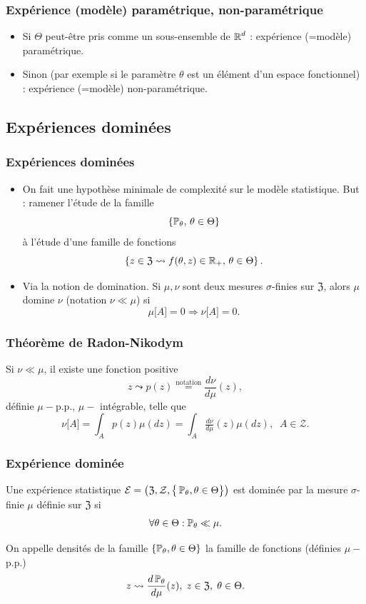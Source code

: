 \begin{frame}
\frametitle{Expérience (mod\`ele) paramétrique, non-paramétrique}
\begin{itemize}
\item Si $\Theta$ peut-être \og pris \fg{} comme un sous-ensemble
de $\operatorname{{\mathbb R}}^d$ : \alert{expérience (=mod\`ele) paramétrique}.
\item Sinon (par exemple si le paramètre $\theta$ est un élément d'un espace fonctionnel) : \alert{expérience (=mod\`ele) non-paramétrique}.
\end{itemize}
\end{frame}

\subsection{Expériences dominées}
\begin{frame}
\frametitle{Expériences dominées}
\begin{itemize}
\item On fait une hypothèse minimale de \og complexité \fg{} sur le modèle statistique. \alert{But} : ramener l'étude de la famille
$$\{\operatorname{{\mathbb P}}_\theta,\,\theta \in \Theta\}$$
à l'étude d'une famille de fonctions
$$\left\{z \in \mathfrak{Z} \leadsto f(\theta,z) \in \operatorname{{\mathbb R}}_+,\,\theta \in \Theta\right\}.$$
\item Via la notion de \alert{domination}. Si $\mu,\nu$ sont deux mesures $\sigma$-finies sur $\mathfrak{Z}$, alors $\mu$ \alert{domine} $\nu$ (notation $\nu \ll \mu$) si
$$\mu\big[A\big]=0 \Rightarrow \nu\big[A\big]=0.$$
\end{itemize}
\end{frame}
\begin{frame}
\frametitle{Théorème de Radon-Nikodym}
\begin{theo}
Si $\nu \ll \mu$, il existe une fonction positive
$$z \leadsto  p(z) \stackrel{\text{notation}}{=} \frac{d\nu}{d\mu}(z),$$ définie $\mu-$p.p., $\mu-$ intégrable, telle que
$$\nu\big[A\big] = \int_{A}p(z) \mu(dz) = \int_{A}\tfrac{d\nu}{d\mu}(z)\mu(dz),\;\;A \in {\mathcal Z}.$$
\end{theo}
\end{frame}
\begin{frame}
\frametitle{Expérience dominée}
\begin{df}
Une expérience statistique ${\mathcal E} = \big(\mathfrak{Z}, {\mathcal Z}, \big\{\operatorname{{\mathbb P}}_\theta, \theta \in \Theta\big\}\big)$ est \alert{dominée} par la mesure $\sigma$-finie $\mu$ définie sur $\mathfrak{Z}$ si
$$\forall \theta \in \Theta : \operatorname{{\mathbb P}}_\theta \ll \mu.$$
\end{df}
On appelle \alert{densités} de la famille $\{\operatorname{{\mathbb P}}_\theta,\theta \in \Theta\}$ la famille de fonctions (définies $\mu-$ p.p.)
$$z\leadsto \frac{d\operatorname{{\mathbb P}}_\theta}{d\mu}(z),\;z\in \mathfrak{Z},\;\theta \in \Theta.$$
\end{frame}




